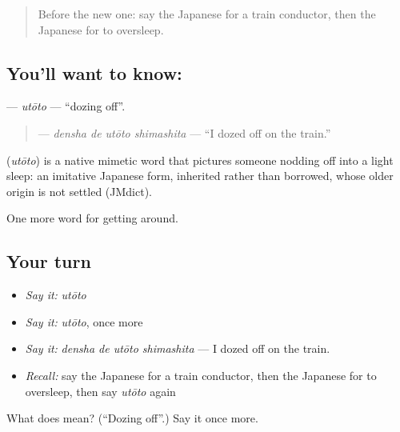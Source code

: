 \label{lesson:JA-C380-utouto}



\begin{quote}
Before the new one: say the Japanese for a train conductor, then the Japanese for to oversleep.
\end{quote}

\subsection*{You'll want to know: }
\textbf{} — \emph{utōto} — \textquotedblleft{}dozing off\textquotedblright{}.

\begin{quote}
\textbf{ } — \emph{densha de utōto shimashita} — \textquotedblleft{}I dozed off on the train.\textquotedblright{}
\end{quote}

\begin{cousinweb}
\textbf{} (\emph{utōto}) is a native mimetic word that pictures someone nodding off into a light sleep: an imitative Japanese form, inherited rather than borrowed, whose older origin is not settled (JMdict).
\end{cousinweb}

\begin{grammarlens}[title={What you've built}]
One more word for getting around.
\end{grammarlens}

\subsection*{Your turn}
\begin{itemize}
\raggedright
  \item \emph{Say it:} \emph{utōto}
  \item \emph{Say it:} \emph{utōto}, once more
  \item \emph{Say it:} \emph{densha de utōto shimashita} — I dozed off on the train.
  \item \emph{Recall:} say the Japanese for a train conductor, then the Japanese for to oversleep, then say \emph{utōto} again
\end{itemize}

\begin{tcolorbox}[breakable,colback=teal!4,colframe=teal!35!black,title={Before you move on}]
What does  mean? (\textquotedblleft{}Dozing off\textquotedblright{}.) Say it once more.
\end{tcolorbox}
